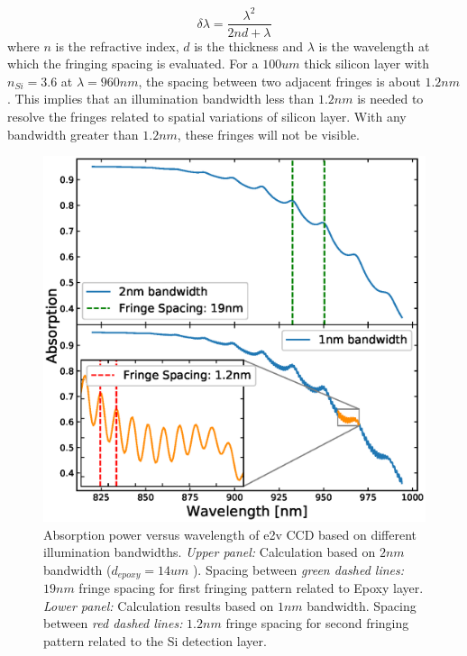\documentclass[twocolumn]{aastex63} %
\begin{document}
\begin{CJK*}{UTF8}{gbsn}
\begin{equation}  \label{eq:Fringe spacing}
    \delta\lambda = \frac{\lambda^2}{2nd + \lambda}
\end{equation}
where $n$ is the refractive index, $d$ is the thickness and $\lambda$ is the wavelength at which the fringing spacing is evaluated. For a $100um$ thick silicon layer with $n_{Si} = 3.6$ at $\lambda = 960 nm$, the spacing between two adjacent fringes is about $1.2 nm$. This implies that an illumination bandwidth less than $1.2nm$ is needed to resolve the fringes related to spatial variations of silicon layer. With any bandwidth greater than $1.2nm$, these fringes will not be visible.
\begin{figure}[tb]
\centering
\includegraphics[scale = 0.45]{bandwidth_verify.eps}
\caption{Absorption power versus wavelength of e2v CCD based on different illumination bandwidths. {\it Upper panel:} Calculation based on $2nm$ bandwidth ($d_{epoxy}=14um$ ). Spacing between {\it green dashed lines:} $19nm$ fringe spacing for first fringing pattern related to Epoxy layer. {\it Lower panel:} Calculation results based on $1nm$ bandwidth. Spacing between {\it red dashed lines:} $1.2nm$ fringe spacing for second fringing pattern related to the Si detection layer.}
\label{fig:bandwidth_sim}
\end{figure}


\end{CJK*}
\end{document}
